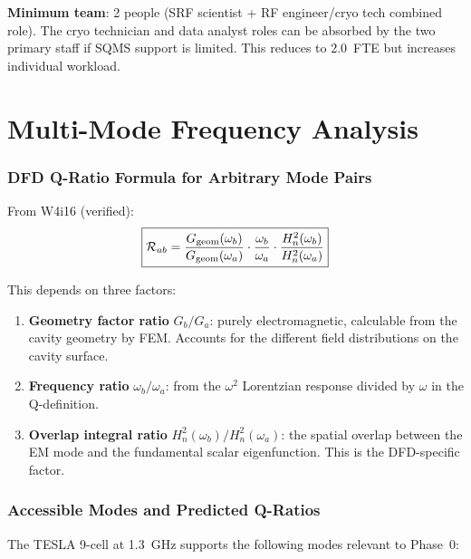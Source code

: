 \documentclass[11pt]{article}
\newcommand{\Heff}{H_n}
\theoremstyle{definition}
\theoremstyle{remark}
\begin{document}
\textbf{Minimum team}: 2 people (SRF scientist + RF engineer/cryo
tech combined role). The cryo technician and data analyst roles can be
absorbed by the two primary staff if SQMS support is limited. This
reduces to 2.0~FTE but increases individual workload.


\part{Multi-Mode Frequency Analysis}
\label{sec:multimode}


\section{DFD Q-Ratio Formula for Arbitrary Mode Pairs}

From W4i16 (verified):
\begin{equation}
\boxed{
\mathcal{R}_{ab} = \frac{G_{\rm geom}(\omega_b)}{G_{\rm geom}(\omega_a)}
\cdot \frac{\omega_b}{\omega_a}
\cdot \frac{\Heff^2(\omega_b)}{\Heff^2(\omega_a)}
}
\label{eq:R-general}
\end{equation}

This depends on three factors:
\begin{enumerate}[nosep]
\item \textbf{Geometry factor ratio} $G_b/G_a$: purely electromagnetic,
  calculable from the cavity geometry by FEM. Accounts for the
  different field distributions on the cavity surface.
\item \textbf{Frequency ratio} $\omega_b/\omega_a$: from the
  $\omega^2$ Lorentzian response divided by $\omega$ in the
  Q-definition.
\item \textbf{Overlap integral ratio} $\Heff^2(\omega_b)/\Heff^2(\omega_a)$:
  the spatial overlap between the EM mode and the fundamental scalar
  eigenfunction. This is the DFD-specific factor.
\end{enumerate}


\section{Accessible Modes and Predicted Q-Ratios}

The TESLA 9-cell at 1.3~GHz supports the following modes relevant to
Phase~0:
\end{document}
